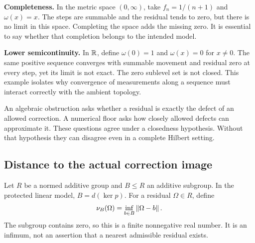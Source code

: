 \textbf{Completeness.} In the metric space \((0,\infty)\), take \(f_n=1/(n+1)\) and \(\omega(x)=x\). The steps are summable and the residual tends to zero, but there is no limit in this space. Completing the space adds the missing zero. It is essential to say whether that completion belongs to the intended model.

\textbf{Lower semicontinuity.} In \(\mathbb R\), define \(\omega(0)=1\) and \(\omega(x)=0\) for \(x\ne0\). The same positive sequence converges with summable movement and residual zero at every step, yet its limit is not exact. The zero sublevel set is not closed. This example isolates why convergence of measurements along a sequence must interact correctly with the ambient topology.




\label{KS:sec:floor}
An algebraic obstruction asks whether a residual is exactly the defect of an allowed correction. A numerical floor asks how closely allowed defects can approximate it. These questions agree under a closedness hypothesis. Without that hypothesis they can disagree even in a complete Hilbert setting.

\subsection{Distance to the actual correction image}
Let \(R\) be a normed additive group and \(B\le R\) an additive subgroup. In the protected linear model, \(B=d(\ker p)\). For a residual \(\Omega\in R\), define
\[
 \nu_B(\Omega)=\inf_{b\in B}\left\lVert\Omega-b\right\rVert.
\]
The subgroup contains zero, so this is a finite nonnegative real number. It is an infimum, not an assertion that a nearest admissible residual exists.

